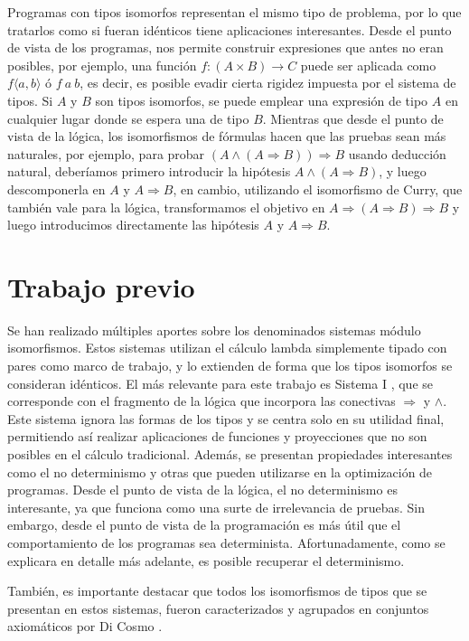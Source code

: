 Programas con tipos isomorfos representan el mismo tipo de problema, por lo que tratarlos como si fueran idénticos tiene aplicaciones interesantes.
Desde el punto de vista de los programas, nos permite construir expresiones que antes no eran posibles, por ejemplo, una función $f : (A \times B) \rightarrow C$ puede ser aplicada como $f \langle a, b \rangle$ ó $f \: a \: b$, es decir, es posible evadir cierta rigidez impuesta por el sistema de tipos.
Si $A$ y $B$ son tipos isomorfos, se puede emplear una expresión de tipo $A$ en cualquier lugar donde se espera una de tipo $B$.
Mientras que desde el punto de vista de la lógica, los isomorfismos de fórmulas hacen que las pruebas sean más naturales, por ejemplo, para probar $(A \wedge (A \Rightarrow  B)) \Rightarrow B$ usando deducción natural, deberíamos primero introducir la hipótesis $A \wedge (A \Rightarrow B)$, y luego descomponerla en $A$ y $A \Rightarrow B$, en cambio, utilizando el isomorfismo de Curry, que también vale para la lógica, transformamos el objetivo en $A \Rightarrow (A \Rightarrow  B) \Rightarrow B$ y luego introducimos directamente las hipótesis $A$ y $A \Rightarrow B$.

\section{Trabajo previo}

Se han realizado múltiples aportes sobre los denominados sistemas módulo isomorfismos.
Estos sistemas utilizan el cálculo lambda simplemente tipado con pares como marco de trabajo, y lo extienden de forma que los tipos isomorfos se consideran idénticos.
El más relevante para este trabajo es Sistema I \cite{system-i}, que se corresponde con el fragmento de la lógica que incorpora las conectivas $\Rightarrow$ y $\wedge$.
Este sistema ignora las formas de los tipos y se centra solo en su utilidad final, permitiendo así realizar aplicaciones de funciones y proyecciones que no son posibles en el cálculo tradicional.
Además, se presentan propiedades interesantes como el no determinismo y otras que pueden utilizarse en la optimización de programas.
Desde el punto de vista de la lógica, el no determinismo es interesante, ya que funciona como una surte de irrelevancia de pruebas.
Sin embargo, desde el punto de vista de la programación es más útil que el comportamiento de los programas sea determinista.
Afortunadamente, como se explicara en detalle más adelante, es posible recuperar el determinismo.

También, es importante destacar que todos los isomorfismos de tipos que se presentan en estos sistemas, fueron caracterizados y agrupados en conjuntos axiomáticos por Di Cosmo \cite{MSCSSurvey05}.

